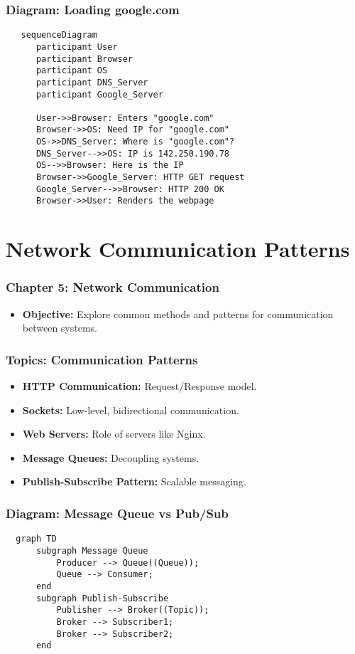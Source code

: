 \documentclass{beamer}
\begin{document}
\begin{frame}[fragile]
  \frametitle{Diagram: Loading google.com}
  \begin{verbatim}
   sequenceDiagram
      participant User
      participant Browser
      participant OS
      participant DNS_Server
      participant Google_Server

      User->>Browser: Enters "google.com"
      Browser->>OS: Need IP for "google.com"
      OS->>DNS_Server: Where is "google.com"?
      DNS_Server-->>OS: IP is 142.250.190.78
      OS-->>Browser: Here is the IP
      Browser->>Google_Server: HTTP GET request
      Google_Server-->>Browser: HTTP 200 OK
      Browser->>User: Renders the webpage
  \end{verbatim}
\end{frame}

\section{Network Communication Patterns}

\begin{frame}
  \frametitle{Chapter 5: Network Communication}
  \begin{itemize}
    \item \textbf{Objective:} Explore common methods and patterns for communication between systems.
  \end{itemize}
\end{frame}

\begin{frame}[fragile]
  \frametitle{Topics: Communication Patterns}
  \begin{itemize}
    \item \textbf{HTTP Communication:} Request/Response model.
    \item \textbf{Sockets:} Low-level, bidirectional communication.
    \item \textbf{Web Servers:} Role of servers like Nginx.
    \item \textbf{Message Queues:} Decoupling systems.
    \item \textbf{Publish-Subscribe Pattern:} Scalable messaging.
  \end{itemize}
\end{frame}

\begin{frame}[fragile]
  \frametitle{Diagram: Message Queue vs Pub/Sub}
  \begin{verbatim}
  graph TD
      subgraph Message Queue
          Producer --> Queue((Queue));
          Queue --> Consumer;
      end
      subgraph Publish-Subscribe
          Publisher --> Broker((Topic));
          Broker --> Subscriber1;
          Broker --> Subscriber2;
      end
  \end{verbatim}
\end{frame}
\end{document}
